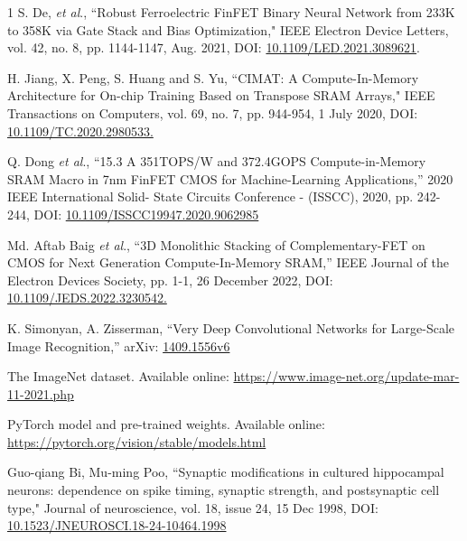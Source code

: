 \documentclass[journal]{IEEEtran}
\begin{document}
\begin{thebibliography}{1}
S. De, \emph{et al}., ``Robust Ferroelectric FinFET Binary Neural Network from 233K to 358K via Gate Stack and Bias Optimization," IEEE Electron Device Letters, vol. 42, no. 8, pp. 1144-1147, Aug. 2021, DOI: \href{https://ieeexplore.ieee.org/document/9455832}{10.1109/LED.2021.3089621}.

H. Jiang, X. Peng, S. Huang and S. Yu, ``CIMAT: A Compute-In-Memory Architecture for On-chip Training Based on Transpose SRAM Arrays," IEEE Transactions on Computers, vol. 69, no. 7, pp. 944-954, 1 July 2020, DOI: \href{https://ieeexplore.ieee.org/document/9035482}{10.1109/TC.2020.2980533.}

Q. Dong \emph{et al}., ``15.3 A 351TOPS/W and 372.4GOPS Compute-in-Memory SRAM Macro in 7nm FinFET CMOS for Machine-Learning Applications,” 2020 IEEE International Solid- State Circuits Conference - (ISSCC), 2020, pp. 242-244, DOI: \href{https://ieeexplore.ieee.org/document/9062985}{10.1109/ISSCC19947.2020.9062985}

Md. Aftab Baig \emph{et al}., ``3D Monolithic Stacking of Complementary-FET on CMOS for Next Generation Compute-In-Memory SRAM,” IEEE Journal of the Electron Devices Society, pp. 1-1, 26 December 2022, DOI: \href{https://ieeexplore.ieee.org/document/9999326}{10.1109/JEDS.2022.3230542.}

K. Simonyan, A. Zisserman, ``Very Deep Convolutional Networks for Large-Scale Image Recognition,”  arXiv: \href{https://arxiv.org/abs/1409.1556}{1409.1556v6}

The ImageNet dataset. Available online: \href{https://www.image-net.org/update-mar-11-2021.php}{https://www.image-net.org/update-mar-11-2021.php}

PyTorch model and pre-trained weights. Available online: \href{https://pytorch.org/vision/stable/models.html}{https://pytorch.org/vision/stable/models.html}

Guo-qiang Bi, Mu-ming Poo, ``Synaptic modifications in cultured hippocampal neurons: dependence on spike timing, synaptic strength, and postsynaptic cell type," Journal of neuroscience, vol. 18, issue 24, 15 Dec 1998, DOI: \href{https://DOI.org/10.1523/JNEUROSCI.18-24-10464.1998}{10.1523/JNEUROSCI.18-24-10464.1998}


\end{thebibliography}
\end{document}
